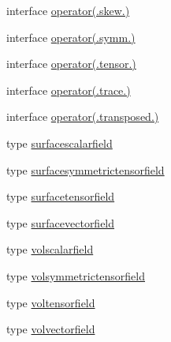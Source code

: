 \begin{DoxyCompactItemize}
\item 
interface \hyperlink{interfacetensor__fields_1_1operator_07_8skew_8_08}{operator(.\-skew.)}
\item 
interface \hyperlink{interfacetensor__fields_1_1operator_07_8symm_8_08}{operator(.\-symm.)}
\item 
interface \hyperlink{interfacetensor__fields_1_1operator_07_8tensor_8_08}{operator(.\-tensor.)}
\item 
interface \hyperlink{interfacetensor__fields_1_1operator_07_8trace_8_08}{operator(.\-trace.)}
\item 
interface \hyperlink{interfacetensor__fields_1_1operator_07_8transposed_8_08}{operator(.\-transposed.)}
\item 
type \hyperlink{structtensor__fields_1_1surfacescalarfield}{surfacescalarfield}
\item 
type \hyperlink{structtensor__fields_1_1surfacesymmetrictensorfield}{surfacesymmetrictensorfield}
\item 
type \hyperlink{structtensor__fields_1_1surfacetensorfield}{surfacetensorfield}
\item 
type \hyperlink{structtensor__fields_1_1surfacevectorfield}{surfacevectorfield}
\item 
type \hyperlink{structtensor__fields_1_1volscalarfield}{volscalarfield}
\item 
type \hyperlink{structtensor__fields_1_1volsymmetrictensorfield}{volsymmetrictensorfield}
\item 
type \hyperlink{structtensor__fields_1_1voltensorfield}{voltensorfield}
\item 
type \hyperlink{structtensor__fields_1_1volvectorfield}{volvectorfield}
\end{DoxyCompactItemize}
